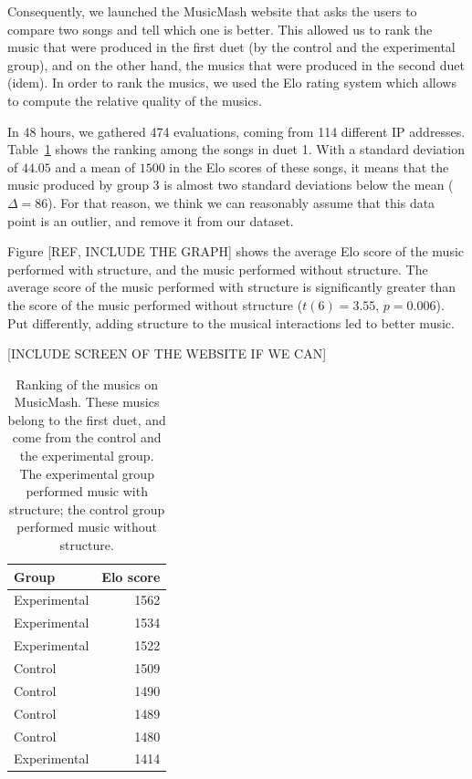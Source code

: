\documentclass{article}
\begin{document}
Consequently, we launched the MusicMash website that asks the users to compare two songs and tell which one is better. This allowed us to rank the music that were produced in the first duet (by the control and the experimental group), and on the other hand, the musics that were produced in the second duet (idem). In order to rank the musics, we used the Elo rating system which allows to compute the relative quality of the musics.

In 48 hours, we gathered 474 evaluations, coming from 114 different IP addresses. Table~\ref{musicmash-results} shows the ranking among the songs in duet 1. With a standard deviation of $44.05$ and a mean of $1500$ in the Elo scores of these songs, it means that the music produced by group 3 is almost two standard deviations below the mean ($\Delta = 86$). For that reason, we think we can reasonably assume that this data point is an outlier, and remove it from our dataset.

Figure [REF, INCLUDE THE GRAPH] shows the average Elo score of the music performed with structure, and the music performed without structure. The average score of the music performed with structure is significantly greater than the score of the music performed without structure ($t(6) = 3.55$, $p = 0.006$). Put differently, adding structure to the musical interactions led to better music.

[INCLUDE SCREEN OF THE WEBSITE IF WE CAN]

\begin{table}[tb]
\begin{center}
\begin{tabular}{l r}
Group & Elo score \\
\hline
Experimental & 1562 \\
Experimental & 1534 \\
Experimental & 1522 \\
Control & 1509 \\
Control & 1490 \\
Control & 1489 \\
Control & 1480 \\
Experimental & 1414 \\
\end{tabular}
\caption{Ranking of the musics on MusicMash. These musics belong to the first duet, and come from the control and the experimental group. The experimental group performed music with structure; the control group performed music without structure.} 
\label{musicmash-results}
\end{center}
\end{table}
\end{document}
